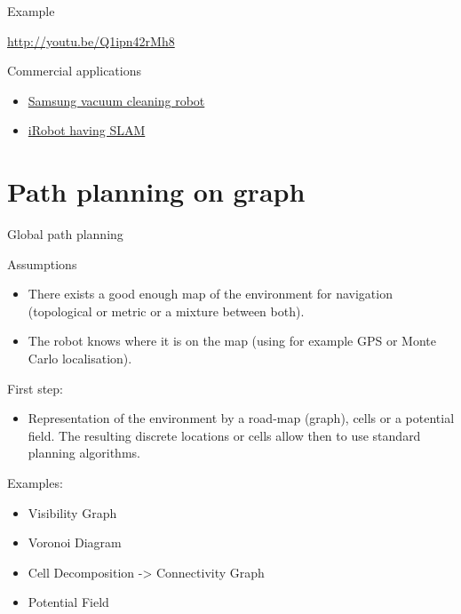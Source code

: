 \documentclass[compress]{beamer}
\begin{document}
\begin{frame}{Example}

\begin{block}{\url{http://youtu.be/Q1ipn42rMh8}}

\end{block}

\end{frame}

\begin{frame}{Commercial applications}

\begin{itemize}
\item \href{https://www.youtube.com/watch?v=bq5HZzGF3vQ}{Samsung vacuum
  cleaning robot}
\item \href{https://www.youtube.com/watch?v=bq5HZzGF3vQ}{iRobot having SLAM}
\end{itemize}

\end{frame}

\section{Path planning on graph}

\begin{frame}{Global path planning}

Assumptions

\begin{itemize}
\item There exists a good enough map of the environment for navigation
  (topological or metric or a mixture between both).
\item The robot knows where it is on the map (using for example GPS or Monte
  Carlo localisation).
\end{itemize}

First step:

\begin{itemize}
\item Representation of the environment by a road-map (graph), cells or a
  potential field. The resulting discrete locations or cells allow then
  to use standard planning algorithms.
\end{itemize}

Examples:

\begin{itemize}
\item Visibility Graph
\item Voronoi Diagram
\item Cell Decomposition -\textgreater{} Connectivity Graph
\item Potential Field
\end{itemize}

\end{frame}
\end{document}
